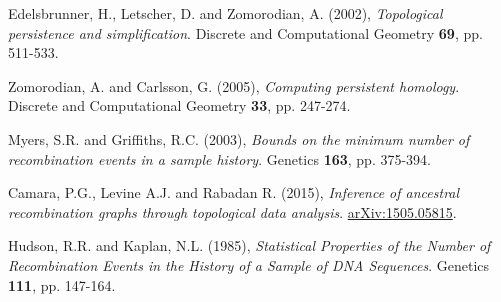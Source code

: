 \documentclass[12pt]{article}
\begin{document}
\begin{thebibliography}{99}

 Edelsbrunner, H., Letscher, D. and Zomorodian, A. (2002), \emph{Topological persistence and simplification}. Discrete and Computational Geometry {\bf 69}, pp. 511-533.

 Zomorodian, A. and Carlsson, G. (2005), \emph{Computing persistent homology}. Discrete and Computational Geometry {\bf 33}, pp. 247-274.

 Myers, S.R. and Griffiths, R.C. (2003), \emph{Bounds on the minimum number of recombination events in a sample history}. Genetics {\bf 163}, pp. 375-394.

 Camara, P.G., Levine A.J. and Rabadan R. (2015), \emph{Inference of ancestral recombination graphs through topological data analysis}. \href{http://arxiv.org/abs/1505.05815}{arXiv:1505.05815}.

 Hudson, R.R. and Kaplan, N.L. (1985), \emph{Statistical Properties of the Number of Recombination Events in the History of a Sample of DNA Sequences}. Genetics {\bf 111}, pp. 147-164.

\end{thebibliography}
\end{document}

